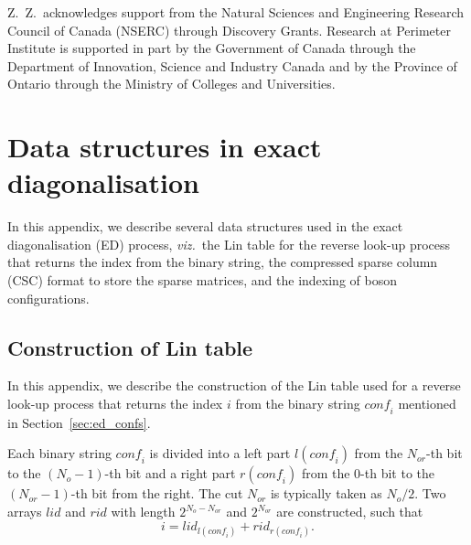 \documentclass{timesjhep}
\begin{document}
Z.~Z.~acknowledges support from the Natural Sciences and Engineering Research Council of Canada (NSERC) through Discovery Grants. Research at Perimeter Institute is supported in part by the Government of Canada through the Department of Innovation, Science and Industry Canada and by the Province of Ontario through the Ministry of Colleges and Universities.

\cleardoublepage
\appendix
{}

\section{Data structures in exact diagonalisation}
\label{app:data}

In this appendix, we describe several data structures used in the exact diagonalisation (ED) process, \textit{viz.}~the Lin table for the reverse look-up process that returns the index from the binary string, the compressed sparse column (CSC) format to store the sparse matrices, and the indexing of boson configurations.

\subsection{Construction of Lin table}
\label{app:data_lin}

In this appendix, we describe the construction of the Lin table used for a reverse look-up process that returns the index $i$ from the binary string $\mathit{conf}_i$ mentioned in Section~\ref{sec:ed_confs}.

Each binary string $\mathit{conf}_i$ is divided into a left part $l(\mathit{conf}_i)$ from the $N_{or}$-th bit to the $(N_o-1)$-th bit and a right part $r(\mathit{conf}_i)$ from the $0$-th bit to the $(N_{or}-1)$-th bit from the right. The cut $N_{or}$ is typically taken as $N_o/2$. Two arrays $\mathit{lid}$ and $\mathit{rid}$ with length $2^{N_o-N_{or}}$ and $2^{N_{or}}$ are constructed, such that
\begin{equation}
    i=\mathit{lid}_{l(\mathit{conf}_i)}+\mathit{rid}_{r(\mathit{conf}_i)}.
\end{equation}
\end{document}

